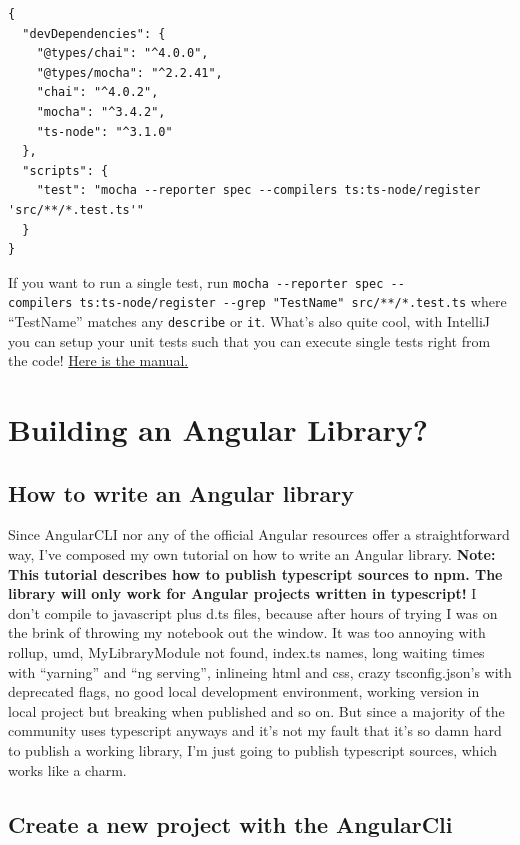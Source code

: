 \documentclass[12pt,a4paper]{article}
\begin{document}
\begin{lstlisting}
{
  "devDependencies": {
    "@types/chai": "^4.0.0",
    "@types/mocha": "^2.2.41",
    "chai": "^4.0.2",
    "mocha": "^3.4.2",
    "ts-node": "^3.1.0"
  },
  "scripts": {
    "test": "mocha --reporter spec --compilers ts:ts-node/register 'src/**/*.test.ts'"
  }
}
\end{lstlisting}

If you want to run a single test, run
\texttt{mocha\ -\/-reporter\ spec\ -\/-compilers\ ts:ts-node/register\ -\/-grep\ "TestName"\ \textquotesingle{}src/**/*.test.ts\textquotesingle{}}
where ``TestName'' matches any \texttt{describe} or \texttt{it}. What's
also quite cool, with IntelliJ you can setup your unit tests such that
you can execute single tests right from the code!
\href{https://www.jetbrains.com/help/idea/2017.1/run-debug-configuration-mocha.html}{Here
is the manual.}


\section{Building an Angular
Library?}\label{building-an-angular-library}

\subsection{How to write an Angular
library}\label{how-to-write-an-angular-library}



Since AngularCLI nor any of the official Angular resources offer a
straightforward way, I've composed my own tutorial on how to write an
Angular library. \textbf{Note: This tutorial describes how to publish
typescript sources to npm. The library will only work for Angular
projects written in typescript!} I don't compile to javascript plus d.ts
files, because after hours of trying I was on the brink of throwing my
notebook out the window. It was too annoying with rollup, umd,
MyLibraryModule not found, index.ts names, long waiting times with
``yarning'' and ``ng serving'', inlineing html and css, crazy
tsconfig.json's with deprecated flags, no good local development
environment, working version in local project but breaking when
published and so on. But since a majority of the community uses
typescript anyways and it's not my fault that it's so damn hard to
publish a working library, I'm just going to publish typescript sources,
which works like a charm.

\subsection{\texorpdfstring{ Create a new project with the
AngularCli}{Create a new project with the AngularCli}}\label{step-1-create-a-new-project-with-the-angularcli}
\end{document}
